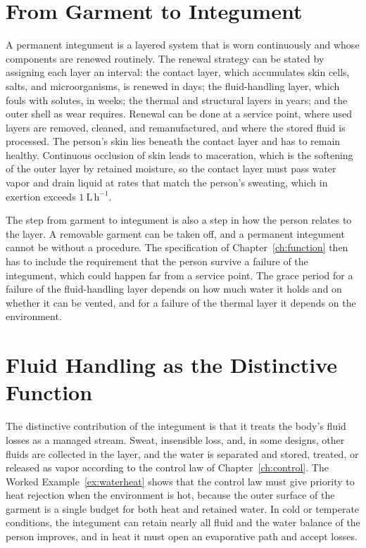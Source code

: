 \documentclass[11pt,openany]{book}
\theoremstyle{definition}
\theoremstyle{remark}
\begin{document}
\section{From Garment to Integument}

A permanent integument is a layered system that is worn continuously and whose components are renewed routinely. The renewal strategy can be stated by assigning each layer an interval: the contact layer, which accumulates skin cells, salts, and microorganisms, is renewed in days; the fluid-handling layer, which fouls with solutes, in weeks; the thermal and structural layers in years; and the outer shell as wear requires. Renewal can be done at a service point, where used layers are removed, cleaned, and remanufactured, and where the stored fluid is processed. The person's skin lies beneath the contact layer and has to remain healthy. Continuous occlusion of skin leads to maceration, which is the softening of the outer layer by retained moisture, so the contact layer must pass water vapor and drain liquid at rates that match the person's sweating, which in exertion exceeds $1\ \mathrm{L\,h^{-1}}$.

The step from garment to integument is also a step in how the person relates to the layer. A removable garment can be taken off, and a permanent integument cannot be without a procedure. The specification of Chapter~\ref{ch:function} then has to include the requirement that the person survive a failure of the integument, which could happen far from a service point. The grace period for a failure of the fluid-handling layer depends on how much water it holds and on whether it can be vented, and for a failure of the thermal layer it depends on the environment.

\section{Fluid Handling as the Distinctive Function}

The distinctive contribution of the integument is that it treats the body's fluid losses as a managed stream. Sweat, insensible loss, and, in some designs, other fluids are collected in the layer, and the water is separated and stored, treated, or released as vapor according to the control law of Chapter~\ref{ch:control}. The Worked Example~\ref{ex:waterheat} shows that the control law must give priority to heat rejection when the environment is hot, because the outer surface of the garment is a single budget for both heat and retained water. In cold or temperate conditions, the integument can retain nearly all fluid and the water balance of the person improves, and in heat it must open an evaporative path and accept losses.
\end{document}

